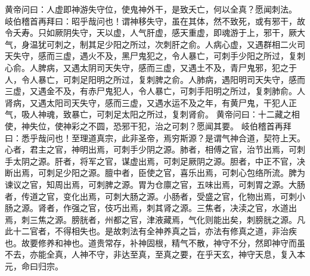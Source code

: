 \documentclass[a4paper,12pt,UTF8,twoside]{ctexbook}
\begin{document}
黄帝问曰：人虚即神游失守位，使鬼神外干，是致夭亡，何以全真？愿闻刺法。
岐伯稽首再拜曰：昭乎哉问也！谓神移失守，虽在其体，然不致死，或有邪干，故令夭寿。只如厥阴失守，天以虚，人气肝虚，感天重虚，即魂游于上，邪干，厥大气，身温犹可刺之，制其足少阳之所过，次刺肝之俞。人病心虚，又遇群相二火司天失守，感而三虚，遇火不及，黑尸鬼犯之，令人暴亡，可刺手少阳之所过，复刺心俞。人脾病，又遇太阴司天失守，感而三虚，又遇土不及，青尸鬼邪，犯之于人，令人暴亡，可刺足阳明之所过，复刺脾之俞。人肺病，遇阳明司天失守，感而三虚，又遇金不及，有赤尸鬼犯人，令人暴亡，可刺手阳明之所过，复刺肺俞。人肾病，又遇太阳司天失守，感而三虚，又遇水运不及之年，有黄尸鬼，干犯人正气，吸人神魂，致暴亡，可刺足太阳之所过，复刺肾俞。
黄帝问曰：十二藏之相使，神失位，使神彩之不圆，恐邪干犯，治之可刺？愿闻其要。
岐伯稽首再拜曰：悉乎哉问也！至理道真宗，此非圣帝，焉穷斯源？是谓气神合道，契符上天。心者，君主之官，神明出焉，可刺手少阴之源。肺者，相傅之官，治节出焉，可刺手太阴之源。肝者，将军之官，谋虚出焉，可刺足厥阴之源。胆者，中正不官，决断出焉，可刺足少阳之源。膻中者，臣使之官，喜乐出焉，可刺心包络所流。脾为谏议之官，知周出焉，可刺脾之源。胃为仓廪之官，五味出焉，可刺胃之源。大肠者，传道之官，变化出焉，可刺大肠之源。小肠者，受盛之官，化物出焉，可刺小肠之源。肾者，作强之官，伎巧出焉，刺其肾之源。三焦者，决渎之官，水道出焉，刺三焦之源。膀胱者，州都之官，津液藏焉，气化则能出矣，刺膀胱之源。凡此十二官者，不得相失也。是故刺法有全神养真之旨，亦法有修真之道，非治疾也。故要修养和神也。道贵常存，补神固根，精气不散，神守不分，然即神守而虽不去，亦能全真，人神不守，非达至真，至真之要，在乎天玄，神守天息，复入本元，命曰归宗。
\end{document}
